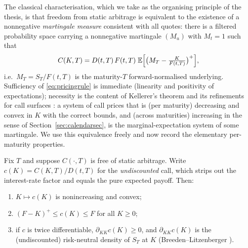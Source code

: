 The classical characterisation, which we take as the organising principle of the thesis, is that
freedom from static arbitrage is equivalent to the existence of a nonnegative
\emph{martingale measure} consistent with all quotes: there is a filtered probability space
carrying a nonnegative martingale $(M_u)$ with $M_t=1$ such that
\begin{equation}\label{eq:pricingrule}
C(K,T)=D(t,T)\,F(t,T)\;\mathbb{E}\Bigl[\bigl(M_T-\tfrac{K}{F(t,T)}\bigr)^+\Bigr],
\end{equation}
i.e.\ $M_T=S_T/F(t,T)$ is the maturity-$T$ forward-normalised underlying. Sufficiency of
\eqref{eq:pricingrule} is immediate (linearity and positivity of expectations); necessity is the
content of Kellerer's theorem \cite{kellerer1972} and its refinements for call surfaces
\cite{coxhobson2005,roper2010}: a system of call prices that is (per maturity) decreasing and
convex in $K$ with the correct bounds, and (across maturities) increasing in the sense of
Section~\ref{sec:calendarsec}, is the marginal-expectation system of some martingale. We use
this equivalence freely and now record the elementary per-maturity properties.

\begin{proposition}\label{prop:shape}
Fix $T$ and suppose $C(\cdot,T)$ is free of static arbitrage. Write $c(K)=C(K,T)/D(t,T)$ for
the \emph{undiscounted} call, which strips out the interest-rate factor and equals the pure
expected payoff. Then:
\begin{enumerate}[label=(\alph*)]
\item $K\mapsto c(K)$ is nonincreasing and convex;
\item $(F-K)^+\le c(K)\le F$ for all $K\ge0$;
\item if $c$ is twice differentiable, $\partial_{KK}c(K)\ge0$, and $\partial_{KK}c(K)$ is the
(undiscounted) risk-neutral density of $S_T$ at $K$ (Breeden--Litzenberger \cite{breeden1978}).
\end{enumerate}
\end{proposition}

